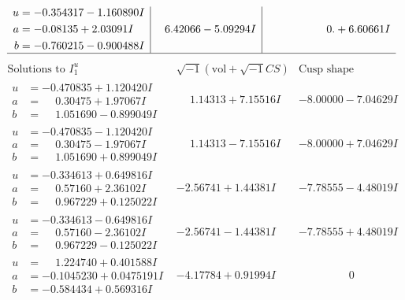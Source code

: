\documentclass[1p]{elsarticle_modified}
\theoremstyle{definition}
\newcommand{\I}{\sqrt{-1}}
\begin{document}
$$\begin{array}{c|c|c}
\begin{aligned}
u &= -0.354317 - 1.160890 I \\
a &= -0.08135 + 2.03091 I \\
b &= -0.760215 - 0.900488 I\end{aligned}
 & \phantom{-}6.42066 - 5.09294 I & \phantom{-0.000000 -}0. + 6.60661 I\\
 \hline 
 \end{array}$$\newpage$$\begin{array}{c|c|c}  
\text{Solutions to }I^u_{1}& \I (\text{vol} + \sqrt{-1}CS) & \text{Cusp shape}\\
 \hline 
\begin{aligned}
u &= -0.470835 + 1.120420 I \\
a &= \phantom{-}0.30475 + 1.97067 I \\
b &= \phantom{-}1.051690 - 0.899049 I\end{aligned}
 & \phantom{-}1.14313 + 7.15516 I & -8.00000 - 7.04629 I \\ \hline\begin{aligned}
u &= -0.470835 - 1.120420 I \\
a &= \phantom{-}0.30475 - 1.97067 I \\
b &= \phantom{-}1.051690 + 0.899049 I\end{aligned}
 & \phantom{-}1.14313 - 7.15516 I & -8.00000 + 7.04629 I \\ \hline\begin{aligned}
u &= -0.334613 + 0.649816 I \\
a &= \phantom{-}0.57160 + 2.36102 I \\
b &= \phantom{-}0.967229 + 0.125022 I\end{aligned}
 & -2.56741 + 1.44381 I & -7.78555 - 4.48019 I \\ \hline\begin{aligned}
u &= -0.334613 - 0.649816 I \\
a &= \phantom{-}0.57160 - 2.36102 I \\
b &= \phantom{-}0.967229 - 0.125022 I\end{aligned}
 & -2.56741 - 1.44381 I & -7.78555 + 4.48019 I \\ \hline\begin{aligned}
u &= \phantom{-}1.224740 + 0.401588 I \\
a &= -0.1045230 + 0.0475191 I \\
b &= -0.584434 + 0.569316 I\end{aligned}
 & -4.17784 + 0.91994 I & \phantom{-0.000000 } 0 \\ \hline\begin{aligned}

\end{aligned}
\end{array}$$
\end{document}
